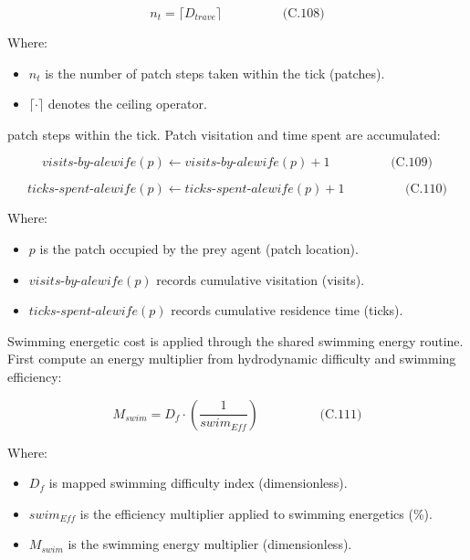 \documentclass[
]{book}
\providecommand{\tightlist}{%
  \setlength{\itemsep}{0pt}\setlength{\parskip}{0pt}}
\begin{document}
\[
\begin{equation} n_t = \lceil D_{trave} \rceil  \hspace{2cm} \text{(C.108)} \end{equation}
\]

Where:

\begin{itemize}
\tightlist
\item
  \(n_t\) is the number of patch steps taken within the tick (patches).
\item
  \(\lceil \cdot \rceil\) denotes the ceiling operator.
\end{itemize}

patch steps within the tick. Patch visitation and time spent are
accumulated:

\[
\begin{equation} visits\text{-}by\text{-}alewife(p) \leftarrow visits\text{-}by\text{-}alewife(p) + 1  \hspace{2cm} \text{(C.109)} \end{equation}
\]

\[
\begin{equation} ticks\text{-}spent\text{-}alewife(p) \leftarrow ticks\text{-}spent\text{-}alewife(p) + 1  \hspace{2cm} \text{(C.110)} \end{equation}
\]

Where:

\begin{itemize}
\tightlist
\item
  \(p\) is the patch occupied by the prey agent (patch location).
\item
  \(visits\text{-}by\text{-}alewife(p)\) records cumulative visitation
  (visits).
\item
  \(ticks\text{-}spent\text{-}alewife(p)\) records cumulative residence
  time (ticks).
\end{itemize}

Swimming energetic cost is applied through the shared swimming energy
routine. First compute an energy multiplier from hydrodynamic difficulty
and swimming efficiency:

\[
\begin{equation} M_{swim} = D_f \cdot \left(\frac{1}{swim_{Eff}}\right)  \hspace{2cm} \text{(C.111)} \end{equation}
\]

Where:

\begin{itemize}
\tightlist
\item
  \(D_f\) is mapped swimming difficulty index (dimensionless).
\item
  \(swim_{Eff}\) is the efficiency multiplier applied to swimming
  energetics (\%).
\item
  \(M_{swim}\) is the swimming energy multiplier (dimensionless).
\end{itemize}
\end{document}
